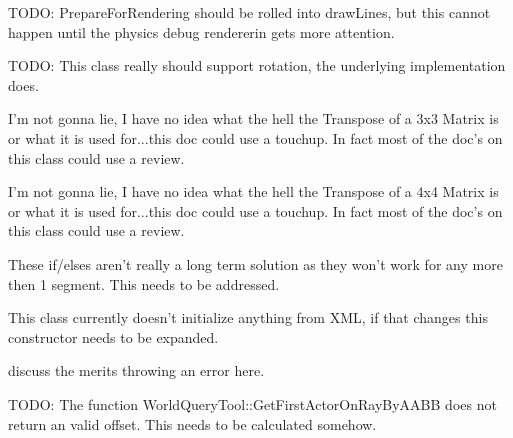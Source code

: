 \begin{DoxyRefList}
\item[\label{todo__todo000044}%
\hypertarget{todo__todo000044}{}%
Member \hyperlink{classMezzanine_1_1LineGroup_a85da1685525915f1e07d685b98f79f23}{Mezzanine\-:\-:Line\-Group\-:\-:draw\-Lines} (void)]T\-O\-D\-O\-: Prepare\-For\-Rendering should be rolled into draw\-Lines, but this cannot happen until the physics debug rendererin gets more attention.  
\item[\label{todo__todo000042}%
\hypertarget{todo__todo000042}{}%
Member \hyperlink{classMezzanine_1_1LineGroup_afbc11e001ce594846b926c7dab7ceafd}{Mezzanine\-:\-:Line\-Group\-:\-:Line\-Group} ()]T\-O\-D\-O\-: This class really should support rotation, the underlying implementation does.  
\item[\label{todo__todo000045}%
\hypertarget{todo__todo000045}{}%
Member \hyperlink{classMezzanine_1_1Matrix3x3_ac759aa60d4dc6dee040b6741b6d44392}{Mezzanine\-:\-:Matrix3x3\-:\-:Transpose} () const ]I'm not gonna lie, I have no idea what the hell the Transpose of a 3x3 Matrix is or what it is used for...this doc could use a touchup. In fact most of the doc's on this class could use a review.  
\item[\label{todo__todo000046}%
\hypertarget{todo__todo000046}{}%
Member \hyperlink{classMezzanine_1_1Matrix4x4_a1330573388a3070bc747bad97d93d3e9}{Mezzanine\-:\-:Matrix4x4\-:\-:Transpose} () const ]I'm not gonna lie, I have no idea what the hell the Transpose of a 4x4 Matrix is or what it is used for...this doc could use a touchup. In fact most of the doc's on this class could use a review.  
\item[\label{todo__todo000048}%
\hypertarget{todo__todo000048}{}%
Member \hyperlink{classMezzanine_1_1MeshManager_aa95df6921ad121eeea7ab073d1d1e5a7}{Mezzanine\-:\-:Mesh\-Manager\-:\-:Create\-Cylinder\-Mesh} (const String \&Mesh\-Name, const String \&Material\-Name, const Vector3 \&Half\-Extents, const Vector3 \&Axis\-Orientation, const Whole \&Circle\-Res=16, const Whole \&Segments=1)]These if/elses aren't really a long term solution as they won't work for any more then 1 segment. This needs to be addressed.  
\item[\label{todo__todo000047}%
\hypertarget{todo__todo000047}{}%
Member \hyperlink{classMezzanine_1_1MeshManager_a830f36f16d0ea53e3bb41d8bdc86076e}{Mezzanine\-:\-:Mesh\-Manager\-:\-:Mesh\-Manager} (X\-M\-L\-::\-Node \&X\-M\-L\-Node)]This class currently doesn't initialize anything from X\-M\-L, if that changes this constructor needs to be expanded.  
\item[\label{todo__todo000054}%
\hypertarget{todo__todo000054}{}%
Member \hyperlink{classMezzanine_1_1Ray_a7164d929caf75bcebceed9149e9a3540}{Mezzanine\-:\-:Ray\-:\-:Get\-Normal} () const ]discuss the merits throwing an error here.  
\item[\label{todo__todo000055}%
\hypertarget{todo__todo000055}{}%
Member \hyperlink{classMezzanine_1_1RayQueryTool_a9ded1647755a523d3dbda297a0e73eba}{Mezzanine\-:\-:Ray\-Query\-Tool\-:\-:Get\-First\-Actor\-On\-Ray\-By\-A\-A\-B\-B} (Ray Actor\-Ray, Whole Object\-Flags)]T\-O\-D\-O\-: The function World\-Query\-Tool\-::\-Get\-First\-Actor\-On\-Ray\-By\-A\-A\-B\-B does not return an valid offset. This needs to be calculated somehow. 


\end{DoxyRefList}
